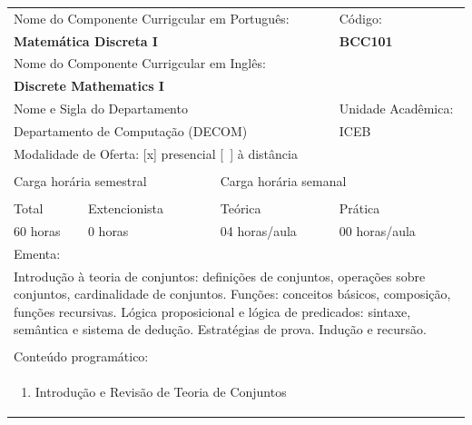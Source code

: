 \documentclass[11pt]{article}
\begin{document}
\begin{center}
\begin{longtable}{|p{4cm}|p{4cm}|p{4cm}|p{4cm}|}  %
\hline
\multicolumn{3}{|p{12cm}|}{Nome do Componente Currigcular em Português:} & \multicolumn{1}{p{4cm}|}{Código:} \\ 
\multicolumn{3}{|p{12cm}|}{\textbf{Matemática Discreta I}} &  \textbf{BCC101}\\ 
\multicolumn{3}{|p{12cm}|}{Nome do Componente Currigcular em Inglês:} &  \\ 
\multicolumn{3}{|p{12cm}|}{\textbf{Discrete Mathematics I}} &  \\ 
\hline
\multicolumn{3}{|p{12cm}|}{Nome e Sigla do Departamento} & Unidade Acadêmica: \\ 
\multicolumn{3}{|p{12cm}|}{Departamento de Computação (DECOM)} & ICEB \\ 
\hline
\multicolumn{4}{|p{12cm}|}{Modalidade de Oferta: [x] presencial \hspace{1cm} [\ ] à distância}\\
\multicolumn{4}{|p{12cm}|}{}\\
\hline
\multicolumn{2}{|p{8cm}|}{Carga horária semestral} & \multicolumn{2}{p{8cm}|}{Carga horária semanal}\\
\multicolumn{2}{|p{8cm}|}{} & \multicolumn{2}{p{8cm}|}{}\\
\hline
\multicolumn{1}{|p{4cm}|}{Total} & \multicolumn{1}{p{4cm}|}{Extencionista} &  \multicolumn{1}{p{4cm}|}{Teórica} &  \multicolumn{1}{p{4cm}|}{Prática} \\
\multicolumn{1}{|p{4cm}|}{60 horas} & \multicolumn{1}{p{4cm}|}{0 horas} &  \multicolumn{1}{p{4cm}|}{04 horas/aula} &  \multicolumn{1}{p{4cm}|}{00 horas/aula} \\
\hline
\multicolumn{4}{|p{16cm}|}{Ementa:}\\
\multicolumn{4}{|p{16cm}|}{Introdução à teoria de conjuntos: definições de conjuntos, operações sobre conjuntos, cardinalidade de conjuntos. Funções: conceitos básicos, composição, funções recursivas. Lógica proposicional e lógica de predicados: sintaxe, semântica e sistema de dedução. Estratégias de prova. Indução e recursão.}\\
\multicolumn{4}{|p{16cm}|}{}\\
\hline
\multicolumn{4}{|p{16cm}|}{Conteúdo programático:}\\
\multicolumn{4}{|p{16cm}|}{\begin{enumerate}
\item Introdução e Revisão de Teoria de Conjuntos

\end{enumerate}}
\end{longtable}
\end{center}
\end{document}
